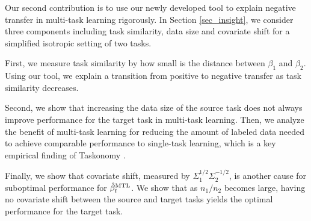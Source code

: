 Our second contribution is to use our newly developed tool to explain negative transfer in multi-task learning rigorously.
In Section \ref{sec_insight}, we consider three components including task similarity, data size and covariate shift for a simplified isotropic setting of two tasks.
\squishlist
		\item First, we measure task similarity by how small is the distance between $\beta_1$ and $\beta_2$.
		Using our tool, we explain a transition from positive to negative transfer as task similarity decreases.
		\item Second, we show that increasing the data size of the source task does not always improve performance for the target task in multi-task learning.
	Then, we analyze the benefit of multi-task learning for reducing the amount of labeled data needed to achieve comparable performance to single-task learning, which is a key empirical finding of Taskonomy \cite{ZSSGM18}.
		\item Finally, we show that covariate shift, measured by $\Sigma_1^{1/2}\Sigma_2^{-1/2}$, is another cause for suboptimal performance for $\hat{\beta}_t^{\text{MTL}}$.
		We show that as $n_1 / n_2$ becomes large, having no covariate shift between the source and target tasks yields the optimal performance for the target task.
\squishend

